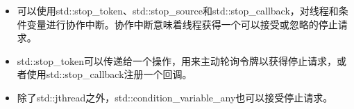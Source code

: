 \begin{tcolorbox}[breakable,enhanced jigsaw,colback=mygreen!5!white,colframe=mygreen!75!black,title={总结}]
	
\begin{itemize}
\item 
可以使用std::stop\_token、std::stop\_source和std::stop\_callback，对线程和条件变量进行协作中断。协作中断意味着线程获得一个可以接受或忽略的停止请求。

\item 
std::stop\_token可以传递给一个操作，用来主动轮询令牌以获得停止请求，或者使用std::stop\_callback注册一个回调。

\item 
除了std::jthread之外，std::condition\_variable\_any也可以接受停止请求。
\end{itemize}
	
\end{tcolorbox}



\newpage















